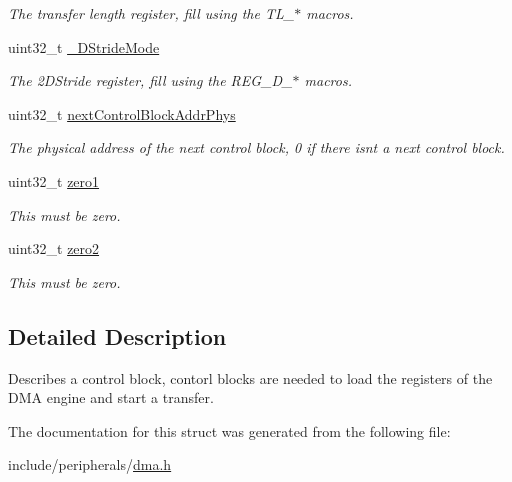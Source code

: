 \begin{DoxyCompactItemize}
\begin{DoxyCompactList}\small\item\em The transfer length register, fill using the T\+L\+\_\+$\ast$ macros. \end{DoxyCompactList}\item 
uint32\+\_\+t \hyperlink{structControlBlock__struct_ad39585a7dc99fd43c6084fa02c42a575}{\+\_\+D\+Stride\+Mode}\hypertarget{structControlBlock__struct_ad39585a7dc99fd43c6084fa02c42a575}{}\label{structControlBlock__struct_ad39585a7dc99fd43c6084fa02c42a575}

\begin{DoxyCompactList}\small\item\em The 2\+D\+Stride register, fill using the R\+E\+G\+\_\+D\+\_\+$\ast$ macros. \end{DoxyCompactList}\item 
uint32\+\_\+t \hyperlink{structControlBlock__struct_ab333b143b88ca4fd4570671cc5bf8688}{next\+Control\+Block\+Addr\+Phys}\hypertarget{structControlBlock__struct_ab333b143b88ca4fd4570671cc5bf8688}{}\label{structControlBlock__struct_ab333b143b88ca4fd4570671cc5bf8688}

\begin{DoxyCompactList}\small\item\em The physical address of the next control block, 0 if there isn\textquotesingle{}t a next control block. \end{DoxyCompactList}\item 
uint32\+\_\+t \hyperlink{structControlBlock__struct_a787cf262b46cd017a01e718f3c278f82}{zero1}\hypertarget{structControlBlock__struct_a787cf262b46cd017a01e718f3c278f82}{}\label{structControlBlock__struct_a787cf262b46cd017a01e718f3c278f82}

\begin{DoxyCompactList}\small\item\em This must be zero. \end{DoxyCompactList}\item 
uint32\+\_\+t \hyperlink{structControlBlock__struct_a84856e5370201ce8b29e199eb34c6baf}{zero2}\hypertarget{structControlBlock__struct_a84856e5370201ce8b29e199eb34c6baf}{}\label{structControlBlock__struct_a84856e5370201ce8b29e199eb34c6baf}

\begin{DoxyCompactList}\small\item\em This must be zero. \end{DoxyCompactList}\end{DoxyCompactItemize}


\subsection{Detailed Description}
Describes a control block, contorl blocks are needed to load the registers of the D\+MA engine and start a transfer. 

The documentation for this struct was generated from the following file\+:\begin{DoxyCompactItemize}
\item 
include/peripherals/\hyperlink{dma_8h}{dma.\+h}\end{DoxyCompactItemize}
